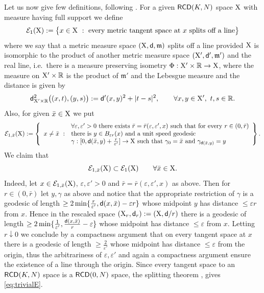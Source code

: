 \documentclass[reqno,11pt]{article}
\numberwithin{equation}{section}
\newcommand{\R}{\mathbb{R}}
\newcommand{\mm}{{\mbox{\boldmath$m$}}}
\newcommand{\sfd}{{\sf d}}
\newcommand{\eps}{\varepsilon}
\renewcommand{\mm}{\mathfrak m}                                %
\newcommand{\X}{{\rm X}}
\newcommand{\RCD}{{\sf RCD}}
\begin{document}
Let us now give few definitions, following \cite[Definition 2.10]{Cheeger-Colding97I}.  For a given $\RCD(K,N)$ space $\X$ with measure having full support we define
\[
\mathcal E_1(\X):=\big\{x\in\X\ :\ \text{every metric tangent space at $x$ splits off a line}\big\}
\]  
where we say that a metric measure space $(\X,\sfd,\mm)$ splits off a line provided $\X$ is isomorphic to the product of another  metric measure space $(\X',\sfd',\mm')$ and the real line, i.e.\ there is a measure preserving isometry $\Phi:\X'\times\R\to\X$, where the measure on $\X'\times\R$ is the product of $\mm'$ and the Lebesgue measure and the distance is given by
\[
\sfd^2_{\X'\times\R}\big((x,t),(y,s)\big):=\sfd'(x,y)^2+|t-s|^2,\qquad\forall x,y\in\X',\ t,s\in\R.
\]
Also, for given $\bar x\in\X$ we put
\[
\begin{split}
\mathcal E_{1,\bar x}(\X):=\left\{\begin{array}{rl}
&\text{$\forall \eps,\eps'>0$ there exists $\bar r=\bar r(\eps,\eps',x)$ such that for every $r\in(0,\bar r)$}\\
x\neq\bar x\ :&\text{there is $y\in B_{\eps r}(x)$ and a unit speed geodesic}\\
&\text{$\gamma:[0,\sfd(\bar x,y)+\tfrac{r}{\eps'}]\to\X$ such that $\gamma_0=\bar x$ and $\gamma_{\sfd(\bar x,y)}=y$}
\end{array}\right\}.
\end{split}
\]
{We claim that
\begin{equation}
\label{eq:trivialE}
\mathcal E_{1,\bar x}(\X)\subset \mathcal E_{1}(\X)\qquad\forall \bar x\in\X.
\end{equation}
Indeed, let $x\in \mathcal E_{1,\bar x}(\X)$, $\eps,\eps'>0$ and $\bar r=\bar r(\eps,\eps',x)$ as above. Then for $r\in(0,\bar r)$ let  $y,\gamma$ as above and notice that the appropriate restriction of $\gamma$ is a geodesic of length $\geq 2\min\{\frac r{\eps'},\sfd(x,\bar x)-\eps r\}$ whose midpoint $y$ has distance $\leq\eps r$ from $x$. Hence in the rescaled space $(\X_r,\sfd_r):=(\X,\sfd/r)$ there is a geodesic of length $\geq 2\min\{\frac 1{\eps'},\frac{\sfd(x,\bar x)}r-\eps \}$ whose midpoint has distance $\leq\eps$ from $x$. Letting $r\downarrow0$ we conclude by a compactness argument that on every tangent space at $x$ there is a geodesic of length $\geq \frac2{\eps'}$ whose midpoint has distance $\leq \eps$ from the origin, thus the arbitrariness of $\eps,\eps'$ and again a compactness argument ensure the existence of a line through the origin. Since every tangent space to an $\RCD(K,N)$ space is a $\RCD(0,N)$ space, the splitting theorem \cite{Gigli13}, \cite{Gigli13over}  gives \eqref{eq:trivialE}.} 
\end{document}
